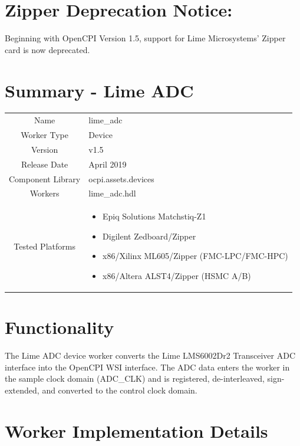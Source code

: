 \documentclass{article}
\author{} %
\date{Version \docVersion} %
\title{\docTitle}
\def\docVersion{1.5}
\def\comp{lime\_adc}
\def\Comp{Lime ADC}
\begin{document}
\section*{Zipper Deprecation Notice:}
Beginning with OpenCPI Version 1.5, support for Lime Microsystems' Zipper card is now deprecated.
\section*{Summary - \Comp}
\begin{tabular}{|c|M{13.5cm}|}
	\hline
	                  &                  \\
	\hline
	Name              & \comp            \\
	\hline
	Worker Type       & Device           \\
	\hline
	Version           & v\docVersion \\
	\hline
	Release Date      & April 2019 \\
	\hline
	Component Library & ocpi.assets.devices     \\
	\hline
	Workers           & \comp.hdl        \\
	\hline
	Tested Platforms  &
\begin{itemize}
  \item Epiq Solutions Matchstiq-Z1
  \item Digilent Zedboard/Zipper
  \item x86/Xilinx ML605/Zipper (FMC-LPC/FMC-HPC)
  \item x86/Altera ALST4/Zipper (HSMC A/B)
\end{itemize} \\
	\hline
\end{tabular}

\section*{Functionality}
\begin{flushleft}
	The Lime ADC device worker converts the Lime LMS6002Dr2 Transceiver ADC interface into the OpenCPI WSI interface. The ADC data enters the worker in the sample clock domain (ADC\_CLK) and is registered, de-interleaved, sign-extended, and converted to the control clock domain.
\end{flushleft}

\section*{Worker Implementation Details}
\end{document}
